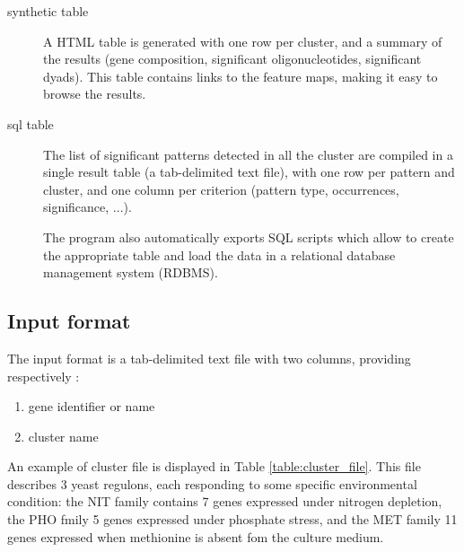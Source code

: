 \begin{description}
\item[synthetic table] A HTML table is generated with one row per
cluster, and a summary of the results (gene composition, significant
oligonucleotides, significant dyads). This table contains links to the
feature maps, making it easy to browse the results.

\item[sql table] The list of significant patterns detected in all the
cluster are compiled in a single result table (a tab-delimited text
file), with one row per pattern and cluster, and one column per
criterion (pattern type, occurrences, significance, ...). 

 The program also automatically exports SQL scripts which allow to
create the appropriate table and load the data in a relational
database management system (RDBMS).
\end{description}

\subsection{Input format}

The input format is a tab-delimited text file with two columns, providing respectively :
\begin{enumerate}
\item gene identifier or name
\item cluster name
\end{enumerate}

An example of cluster file is displayed in Table
\ref{table:cluster_file}. This file describes 3 yeast regulons, each
responding to some specific environmental condition: the NIT family
contains 7 genes expressed under nitrogen depletion, the PHO fmily 5
genes expressed under phosphate stress, and the MET family 11 genes
expressed when methionine is absent fom the culture medium.


